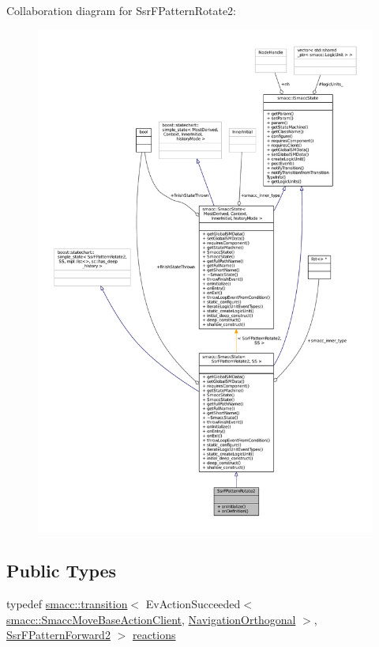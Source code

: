Collaboration diagram for Ssr\+F\+Pattern\+Rotate2\+:
\nopagebreak
\begin{figure}[H]
\begin{center}
\leavevmode
\includegraphics[width=350pt]{structSsrFPatternRotate2__coll__graph}
\end{center}
\end{figure}
\subsection*{Public Types}
\begin{DoxyCompactItemize}
\item 
typedef \hyperlink{classsmacc_1_1transition}{smacc\+::transition}$<$ Ev\+Action\+Succeeded$<$ \hyperlink{classsmacc_1_1SmaccMoveBaseActionClient}{smacc\+::\+Smacc\+Move\+Base\+Action\+Client}, \hyperlink{classNavigationOrthogonal}{Navigation\+Orthogonal} $>$, \hyperlink{structSsrFPatternForward2}{Ssr\+F\+Pattern\+Forward2} $>$ \hyperlink{structSsrFPatternRotate2_abd351e2ecdac7b34778f5b4e9fbeda9b}{reactions}
\end{DoxyCompactItemize}
